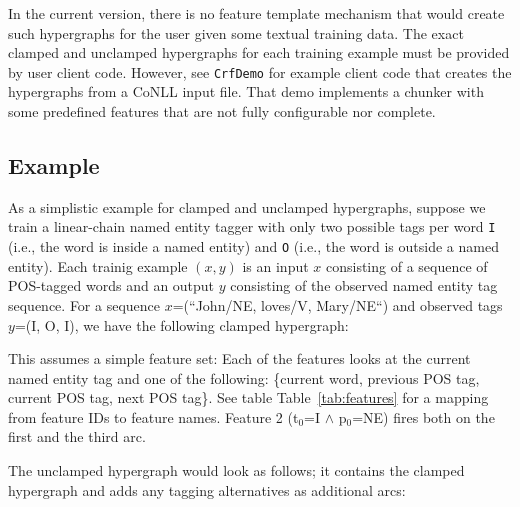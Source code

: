 \documentclass[12pt]{article}
\newcommand{\yellowlisting}[1]{%
  }
\newcommand{\tabref}[1]{Table~\ref{tab:#1}}
\begin{document}
In the current version, there is no feature template mechanism that
would create such hypergraphs for the user given some textual training
data. The exact clamped and unclamped hypergraphs for each training
example must be provided by user client code. However, see
\texttt{CrfDemo} for example client code that creates the hypergraphs
from a CoNLL input file. That demo implements a chunker with some
predefined features that are not fully configurable nor complete.

\subsection{Example}

As a simplistic example for clamped and unclamped hypergraphs, suppose
we train a linear-chain named entity tagger with only two possible
tags per word \texttt{I} (i.e., the word is inside a named entity) and
\texttt{O} (i.e., the word is outside a named entity).  Each trainig
example $(x,y)$ is an input $x$ consisting of a sequence of POS-tagged
words and an output $y$ consisting of the observed named entity tag
sequence. For a sequence $x$=(``John\slash NE, loves\slash V,
Mary\slash NE``) and observed tags $y$=(I, O, I), we have the
following clamped hypergraph: \yellowlisting{fig/clamped.hyp}

This assumes a simple feature set: Each of the features looks at the
current named entity tag and one of the following: \{current word,
  previous POS tag, current POS tag, next POS tag\}. See table
\tabref{features} for a mapping from feature IDs to feature
names. Feature 2 (t$_0$=I $\land$ p$_{0}$=NE) fires both on the first
and the third arc.

\noindent The unclamped hypergraph would look as follows; it contains
the clamped hypergraph and adds any tagging alternatives as additional
arcs: \yellowlisting{fig/unclamped.hyp}
\end{document}

